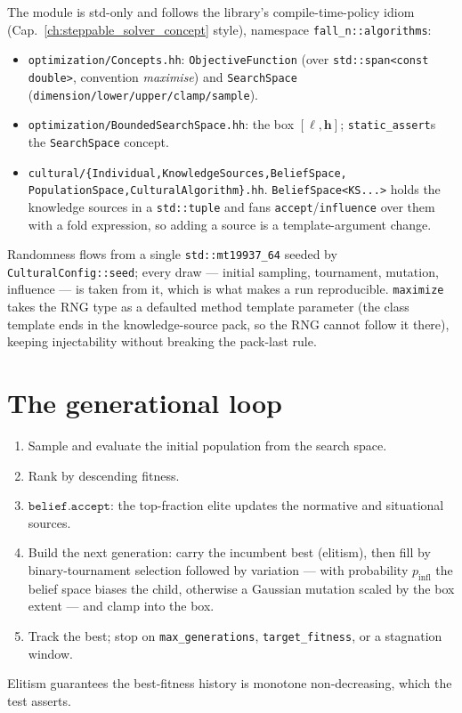 The module is std-only and follows the library's compile-time-policy
idiom (Cap.~\ref{ch:steppable_solver_concept} style), namespace
\texttt{fall\_n::algorithms}:
%
\begin{itemize}
  \item \texttt{optimization/Concepts.hh}: \texttt{ObjectiveFunction}
        (over \texttt{std::span<const double>}, convention
        \emph{maximise}) and \texttt{SearchSpace}
        (\texttt{dimension/lower/upper/clamp/sample}).
  \item \texttt{optimization/BoundedSearchSpace.hh}: the box
        \([\boldsymbol\ell,\mathbf{h}]\); \texttt{static\_assert}s the
        \texttt{SearchSpace} concept.
  \item \texttt{cultural/\{Individual,KnowledgeSources,BeliefSpace,
        PopulationSpace,CulturalAlgorithm\}.hh}.
        \texttt{BeliefSpace<KS...>} holds the knowledge sources in a
        \texttt{std::tuple} and fans \texttt{accept}/\texttt{influence}
        over them with a fold expression, so adding a source is a
        template-argument change.
\end{itemize}
%
Randomness flows from a single \texttt{std::mt19937\_64} seeded by
\texttt{CulturalConfig::seed}; every draw --- initial sampling, tournament,
mutation, influence --- is taken from it, which is what makes a run
reproducible. \texttt{maximize} takes the RNG type as a defaulted method
template parameter (the class template ends in the knowledge-source pack,
so the RNG cannot follow it there), keeping injectability without
breaking the pack-last rule.

\section{The generational loop}

\begin{enumerate}
  \item Sample and evaluate the initial population from the search space.
  \item Rank by descending fitness.
  \item \(\texttt{belief.accept}\): the top-fraction elite updates the
        normative and situational sources.
  \item Build the next generation: carry the incumbent best (elitism),
        then fill by binary-tournament selection followed by variation
        --- with probability \(p_\text{infl}\) the belief space biases the
        child, otherwise a Gaussian mutation scaled by the box extent ---
        and clamp into the box.
  \item Track the best; stop on \texttt{max\_generations},
        \texttt{target\_fitness}, or a stagnation window.
\end{enumerate}
%
Elitism guarantees the best-fitness history is monotone
non-decreasing, which the test asserts.

